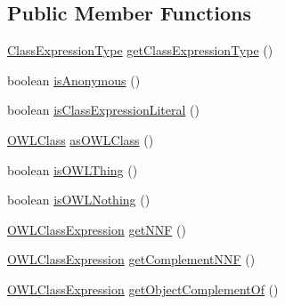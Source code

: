 \subsection*{Public Member Functions}
\begin{DoxyCompactItemize}
\item 
\hyperlink{enumorg_1_1semanticweb_1_1owlapi_1_1model_1_1_class_expression_type}{Class\-Expression\-Type} \hyperlink{interfaceorg_1_1semanticweb_1_1owlapi_1_1model_1_1_o_w_l_class_expression_a41cee339da2f9fc98508239ff8dc04a4}{get\-Class\-Expression\-Type} ()
\item 
boolean \hyperlink{interfaceorg_1_1semanticweb_1_1owlapi_1_1model_1_1_o_w_l_class_expression_a3c74b2c64b514e3b230e3bee24051874}{is\-Anonymous} ()
\item 
boolean \hyperlink{interfaceorg_1_1semanticweb_1_1owlapi_1_1model_1_1_o_w_l_class_expression_aa209626b5e5a33649a50cb0c4ac7de1f}{is\-Class\-Expression\-Literal} ()
\item 
\hyperlink{interfaceorg_1_1semanticweb_1_1owlapi_1_1model_1_1_o_w_l_class}{O\-W\-L\-Class} \hyperlink{interfaceorg_1_1semanticweb_1_1owlapi_1_1model_1_1_o_w_l_class_expression_a68927c8dfde650b73dc4adb10c040968}{as\-O\-W\-L\-Class} ()
\item 
boolean \hyperlink{interfaceorg_1_1semanticweb_1_1owlapi_1_1model_1_1_o_w_l_class_expression_a02e54351061a7b6b530729b25ed8d6b9}{is\-O\-W\-L\-Thing} ()
\item 
boolean \hyperlink{interfaceorg_1_1semanticweb_1_1owlapi_1_1model_1_1_o_w_l_class_expression_a97112c083d063d3b89b870a145e251c8}{is\-O\-W\-L\-Nothing} ()
\item 
\hyperlink{interfaceorg_1_1semanticweb_1_1owlapi_1_1model_1_1_o_w_l_class_expression}{O\-W\-L\-Class\-Expression} \hyperlink{interfaceorg_1_1semanticweb_1_1owlapi_1_1model_1_1_o_w_l_class_expression_abfbd1e2889078e4056bc7edb87b9b4de}{get\-N\-N\-F} ()
\item 
\hyperlink{interfaceorg_1_1semanticweb_1_1owlapi_1_1model_1_1_o_w_l_class_expression}{O\-W\-L\-Class\-Expression} \hyperlink{interfaceorg_1_1semanticweb_1_1owlapi_1_1model_1_1_o_w_l_class_expression_a9f349ad85ffb636606db2050036a0ef4}{get\-Complement\-N\-N\-F} ()
\item 
\hyperlink{interfaceorg_1_1semanticweb_1_1owlapi_1_1model_1_1_o_w_l_class_expression}{O\-W\-L\-Class\-Expression} \hyperlink{interfaceorg_1_1semanticweb_1_1owlapi_1_1model_1_1_o_w_l_class_expression_a7714507b095263c57c723e31071d5647}{get\-Object\-Complement\-Of} ()
\item 

\end{DoxyCompactItemize}
